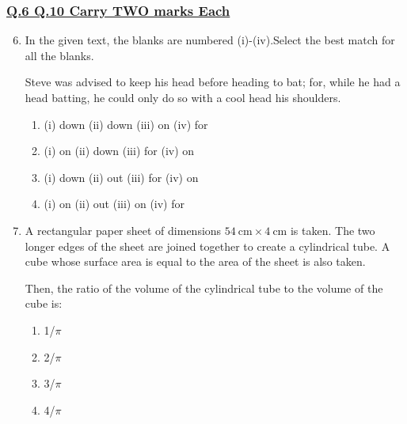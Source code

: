 \documentclass[journal]{IEEEtran}
\theoremstyle{remark}
\begin{document}
\subsubsection{\underline{Q.6 \text{-} Q.10 Carry TWO marks Each}}



\begin{enumerate}
\setcounter{enumi}{5}

\item In the given text, the blanks are numbered (i)-(iv).Select the best match for all the blanks. 
\setlength{\parskip}{1em}


Steve was advised to keep his head \underline{} before heading \underline{} to bat;  
for, while he had a head \underline{} batting, he could only do so with a cool head\underline{} his shoulders.

\begin{enumerate}[leftmargin=2.5em, labelsep=0.5em, itemsep=0.5em]
    \item (i) down \quad (ii) down \quad (iii) on \quad (iv) for
    \item (i) on \quad (ii) down \quad (iii) for \quad (iv) on
    \item (i) down \quad (ii) out \quad (iii) for \quad (iv) on
    \item (i) on \quad (ii) out \quad (iii) on \quad (iv) for
\end{enumerate}
\end{enumerate}

\begin{enumerate}[itemsep=1em]
\setcounter{enumi}{6}

\item A rectangular paper sheet of dimensions $54\ \text{cm} \times 4\ \text{cm}$ is taken. The two longer edges of the sheet are joined together to create a cylindrical tube. A cube whose surface area is equal to the area of the sheet is also taken.  

Then, the ratio of the volume of the cylindrical tube to the volume of the cube is:
\begin{multicols}{4}
\begin{enumerate}
      \item 1/$\pi$
      \item 2/$\pi$
      \item 3/$\pi$
      \item 4/$\pi$
\end{enumerate}
\end{multicols}
\end{enumerate}
\end{document}
